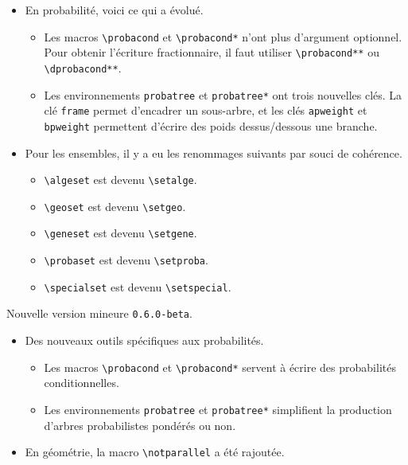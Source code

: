 \documentclass[12pt,a4paper]{article}
\begin{document}
\begin{description}[leftmargin=1em]
\begin{itemize}
        \item En probabilité, voici ce qui a évolué.
        \begin{itemize}
        	\item Les macros \verb+\probacond+ et \verb+\probacond*+ n'ont plus d'argument optionnel. Pour obtenir l'écriture fractionnaire, il faut utiliser \verb+\probacond**+ ou \verb+\dprobacond**+.

        	\item Les environnements \verb+probatree+ et \verb+probatree*+ ont trois nouvelles clés.
			      La clé \verb+frame+ permet d'encadrer un sous-arbre, et les clés \verb+apweight+ et \verb+bpweight+ permettent d'écrire des poids dessus/dessous une branche.
        \end{itemize}
    
        \item Pour les ensembles, il y a eu les renommages suivants par souci de cohérence.
        \begin{itemize}
        	\item \verb+\algeset+ est devenu \verb+\setalge+.
        	\item \verb+\geoset+ est devenu \verb+\setgeo+.
        	\item \verb+\geneset+ est devenu \verb+\setgene+.
        	\item \verb+\probaset+ est devenu \verb+\setproba+.
        	\item \verb+\specialset+ est devenu \verb+\setspecial+.
        \end{itemize}
    \end{itemize}  
    


    \item[2019-10-10] Nouvelle version mineure \verb+0.6.0-beta+.
    \begin{itemize}
        \item Des nouveaux outils spécifiques aux probabilités.
        \begin{itemize}
            \item Les macros \verb+\probacond+ et \verb+\probacond*+ servent à écrire des probabilités conditionnelles.

            \item Les environnements \verb+probatree+ et \verb+probatree*+ simplifient la production d'arbres probabilistes pondérés ou non.
        \end{itemize}

        \item En géométrie, la macro \verb+\notparallel+ a été rajoutée.


\end{itemize}
\end{description}
\end{document}

